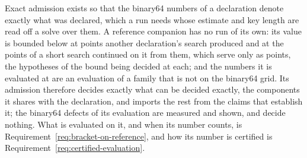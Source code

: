 
Exact admission exists so that the binary64 numbers of a declaration denote
exactly what was declared, which a run needs whose estimate and key length
are read off a solve over them. A reference companion has no run of its own:
its value is bounded below at points another declaration's search produced
and at the points of a short search continued on it from them, which serve
only as points, the hypotheses of the bound being decided at each; and the
numbers it is evaluated at are an evaluation of a family that is not on the
binary64 grid. Its admission
therefore decides exactly what can be decided exactly, the components it
shares with the declaration, and imports the rest from the claims that
establish it; the binary64 defects of its evaluation are measured and shown,
and decide nothing. What is evaluated on it, and when its number counts, is
Requirement~\ref{req:bracket-on-reference}, and how its number is certified
is Requirement~\ref{req:certified-evaluation}.

